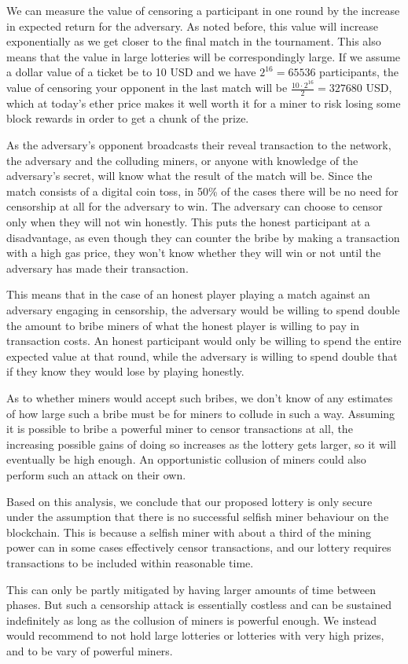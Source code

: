 We can measure the value of censoring a participant in one round by the increase in expected return for the adversary. As noted before, this value will increase exponentially as we get closer to the final match in the tournament. This also means that the value in large lotteries will be correspondingly large. If we assume a dollar value of a ticket be to 10 USD and we have $2^{16}=65536$ participants, the value of censoring your opponent in the last match will be $\frac{10 \cdot 2^{16}}{2}=327680$ USD, which at today's ether price makes it well worth it for a miner to risk losing some block rewards in order to get a chunk of the prize.

As the adversary's opponent broadcasts their reveal transaction to the network, the adversary and the colluding miners, or anyone with knowledge of the adversary's secret, will know what the result of the match will be. Since the match consists of a digital coin toss, in 50\% of the cases there will be no need for censorship at all for the adversary to win. The adversary can choose to censor only when they will not win honestly. This puts the honest participant at a disadvantage, as even though they can counter the bribe by making a transaction with a high gas price, they won't know whether they will win or not until the adversary has made their transaction.

This means that in the case of an honest player playing a match against an adversary engaging in censorship, the adversary would be willing to spend double the amount to bribe miners of what the honest player is willing to pay in transaction costs. An honest participant would only be willing to spend the entire expected value at that round, while the adversary is willing to spend double that if they know they would lose by playing honestly.

As to whether miners would accept such bribes, we don't know of any estimates of how large such a bribe must be for miners to collude in such a way. Assuming it is possible to bribe a powerful miner to censor transactions at all, the increasing possible gains of doing so increases as the lottery gets larger, so it will eventually be high enough. An opportunistic collusion of miners could also perform such an attack on their own.

Based on this analysis, we conclude that our proposed lottery is only secure under the assumption that there is no successful selfish miner behaviour on the blockchain. This is because a selfish miner with about a third of the mining power can in some cases effectively censor transactions, and our lottery requires transactions to be included within reasonable time. 

This can only be partly mitigated by having larger amounts of time between phases. But such a censorship attack is essentially costless and can be sustained indefinitely as long as the collusion of miners is powerful enough. We instead would recommend to not hold large lotteries or lotteries with very high prizes, and to be vary of powerful miners.
